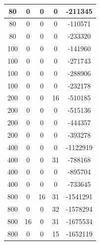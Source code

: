 \documentclass[a4paper]{article}
\begin{document}
\begin{table}[]
\begin{minipage}[b]{10cm}
\begin{tabular}{|c|c|c|c|c|}
      80            & 0             & 0                   & 0                & -211345      \\ \hline
      80            & 0             & 0                   & 0                & -110571      \\ \hline
      80            & 0             & 0                   & 0                & -233320      \\ \hline
      100           & 0             & 0                   & 0                & -141960      \\ \hline
      100           & 0             & 0                   & 0                & -271743      \\ \hline
      100           & 0             & 0                   & 0                & -288906      \\ \hline
      100           & 0             & 0                   & 0                & -232178      \\ \hline
      200           & 0             & 0                   & 16               & -510185      \\ \hline
      200           & 0             & 0                   & 0                & -515136      \\ \hline
      200           & 0             & 0                   & 0                & -444357      \\ \hline
      200           & 0             & 0                   & 0                & -393278      \\ \hline
      400           & 0             & 0                   & 0                & -1122919     \\ \hline
      400           & 0             & 0                   & 31               & -788168      \\ \hline
      400           & 0             & 0                   & 0                & -895704      \\ \hline
      400           & 0             & 0                   & 0                & -733645      \\ \hline
      800           & 0             & 16                  & 31               & -1541291     \\ \hline
      800           & 0             & 0                   & 32               & -1578294     \\ \hline
      800           & 16            & 0                   & 31               & -1675534     \\ \hline
      800           & 0             & 0                   & 15               & -1652119     \\ \hline

\end{tabular}
\end{minipage}
\end{table}
\end{document}

